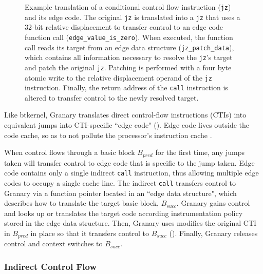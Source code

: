 \documentclass[preprint]{sigplanconf}
\begin{document}
\begin{figure}[t!]
\hfill
{}
\caption{\label{fig:direct_edge_code}Example translation of a conditional control flow instruction (\texttt{jz}) and its edge code. The original \texttt{jz} is translated into a \texttt{jz} that uses a 32-bit relative displacement to transfer control to an edge code function call (\texttt{edge\_value\_is\_zero}). When executed, the function call reads its target from an edge data structure (\texttt{jz\_patch\_data}), which contains all information necessary to resolve the \texttt{jz}'s target and patch the original \texttt{jz}. Patching is performed with a four byte atomic write to the relative displacement operand of the \texttt{jz} instruction. Finally, the return address of the \texttt{call} instruction is altered to transfer control to the newly resolved target.}
\end{figure}
Like btkernel, Granary translates direct control-flow instructions (CTIs) into equivalent jumps into CTI-specific ``edge code" (). Edge code lives outside the code cache, so as to not pollute the processor's instruction cache \cite{btkernel}.

When control flows through a basic block $B_{pred}$ for the first time, any jumps taken will transfer control to edge code that is specific to the jump taken. Edge code contains only a single indirect \texttt{call} instruction, thus allowing multiple edge codes to occupy a single cache line. The indirect \texttt{call} transfers control to Granary via a function pointer located in an ``edge data structure", which describes how to translate the target basic block, $B_{succ}$. Granary gains control and looks up or translates the target code according instrumentation policy stored in the edge data structure. Then, Granary uses modifies the original CTI in $B_{pred}$ in place so that it transfers control to $B_{succ}$  (). Finally, Granary releases control and context switches to $B_{succ}$.


\subsubsection{Indirect Control Flow}\label{sec:ibl}
\end{document}
